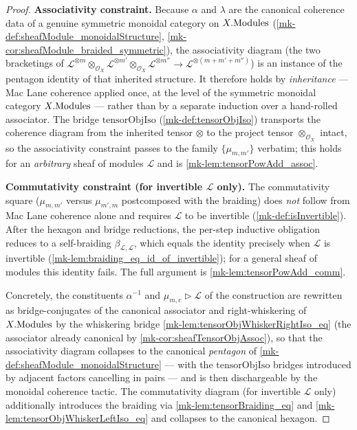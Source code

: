 \begin{proof}
  \textbf{Associativity constraint.} Because \(\alpha\) and \(\lambda\) are the
  canonical coherence data of a genuine symmetric monoidal category on
  \(X.\mathrm{Modules}\) (\ref{mk-def:sheafModule_monoidalStructure},
  \ref{mk-cor:sheafModule_braided_symmetric}), the associativity diagram (the two
  bracketings of \(\mathcal{L}^{\otimes m} \otimes_{\mathcal{O}_X}
  \mathcal{L}^{\otimes m'} \otimes_{\mathcal{O}_X} \mathcal{L}^{\otimes m''} \to
  \mathcal{L}^{\otimes (m+m'+m'')}\)) is an instance of the pentagon identity of
  that inherited structure. It therefore holds by \emph{inheritance} --- Mac Lane
  coherence applied once, at the level of the symmetric monoidal category
  \(X.\mathrm{Modules}\) --- rather than by a separate induction over a hand-rolled
  associator. The bridge \(\mathrm{tensorObjIso}\) (\ref{mk-def:tensorObjIso})
  transports the coherence diagram from the inherited tensor \(\otimes\) to the
  project tensor \(\otimes_{\mathcal{O}_X}\) intact, so the associativity
  constraint passes to the family \(\{\mu_{m,m'}\}\) verbatim; this holds for an
  \emph{arbitrary} sheaf of modules \(\mathcal{L}\) and is \ref{mk-lem:tensorPowAdd_assoc}.

  \textbf{Commutativity constraint (for invertible \(\mathcal{L}\) only).} The
  commutativity square (\(\mu_{m,m'}\) versus \(\mu_{m',m}\) postcomposed with the
  braiding) does \emph{not} follow from Mac Lane coherence alone and requires
  \(\mathcal{L}\) to be invertible (\ref{mk-def:isInvertible}). After the hexagon and
  bridge reductions, the per-step inductive obligation reduces to a self-braiding
  \(\beta_{\mathcal{L},\mathcal{L}}\), which equals the identity precisely when
  \(\mathcal{L}\) is invertible (\ref{mk-lem:braiding_eq_id_of_invertible}); for a
  general sheaf of modules this identity fails. The full argument is
  \ref{mk-lem:tensorPowAdd_comm}.

  Concretely, the constituents \(\alpha^{-1}\) and \(\mu_{m,c} \rhd \mathcal{L}\)
  of the construction are rewritten as bridge-conjugates of the canonical associator
  and right-whiskering of \(X.\mathrm{Modules}\) by the whiskering bridge
  \ref{mk-lem:tensorObjWhiskerRightIso_eq} (the associator already canonical by
  \ref{mk-cor:sheafTensorObjAssoc}), so that the associativity diagram collapses to the
  canonical \emph{pentagon} of \ref{mk-def:sheafModule_monoidalStructure} --- with the
  \(\mathrm{tensorObjIso}\) bridges introduced by adjacent factors cancelling in
  pairs --- and is then dischargeable by the \(\mathrm{monoidal}\) coherence tactic.
  The commutativity diagram (for invertible \(\mathcal{L}\) only) additionally
  introduces the braiding via \ref{mk-lem:tensorBraiding_eq} and
  \ref{mk-lem:tensorObjWhiskerLeftIso_eq} and collapses to the canonical hexagon.
\end{proof}

